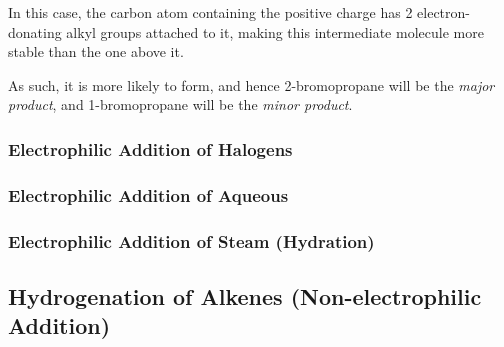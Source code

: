 
		In this case, the carbon atom containing the positive charge has 2 electron-donating alkyl groups attached to it,
		making this intermediate molecule more stable than the one above it.

		As such, it is more likely to form, and hence 2-bromopropane will be the \textit{major product}, and
		1-bromopropane will be the \textit{minor product}.



	\subsubsection{Electrophilic Addition of Halogens}




	\subsubsection{Electrophilic Addition of Aqueous }



	\subsubsection{Electrophilic Addition of Steam (Hydration)}



\subsection{Hydrogenation of Alkenes (Non-electrophilic Addition)}

